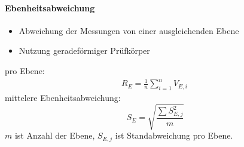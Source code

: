\documentclass[12pt]{article}
\begin{document}
\paragraph{Ebenheitsabweichung}
\begin{itemize}
	\item Abweichung der Messungen von einer ausgleichenden Ebene
	\item Nutzung geradeförmiger Prüfkörper
\end{itemize}
pro Ebene:
\begin{gather*}
	R_E = \frac{1}{n} \sum_{i=1}^{n} V_{E,i} \
\end{gather*}
mittelere Ebenheitsabweichung:
\begin{equation*}
	S_E = \sqrt{\frac{\sum S^2_{E,j}}{m}}
\end{equation*}
$m$ ist Anzahl der Ebene, $S_{E,j}$ ist Standabweichung pro Ebene. 
\end{document}
